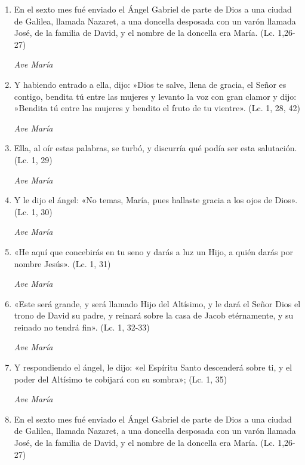 \documentclass[a4paper,11pt, oneside]{report}
\begin{document}
      \begin{enumerate}
        \item En el sexto mes fué enviado el Ángel Gabriel de parte de Dios a una ciudad de Galilea, llamada Nazaret, a una 
        doncella desposada con un varón llamada José, de la familia de David, y el nombre de la doncella era María. (Lc. 1,26- 27)

        \textit{Ave María}

        \item Y habiendo entrado a ella, dijo: »Dios te salve, llena de gracia, el Señor es contigo, bendita tú entre las mujeres 
        y levanto la voz con gran clamor y dijo: »Bendita tú entre las mujeres y bendito el fruto de tu vientre». (Lc. 1, 28, 42)

        \textit{Ave María}

        \item Ella, al oír estas palabras, se turbó, y discurría qué podía ser esta salutación. (Lc. 1, 29)

        \textit{Ave María}

        \item Y le dijo el ángel: «No temas, María, pues hallaste gracia a los ojos de Dios». (Lc. 1, 30)

        \textit{Ave María}

        \item «He aquí que concebirás en tu seno y darás a luz un Hijo, a quién darás por nombre Jesús». (Lc. 1, 31)

        \textit{Ave María}

        \item «Este será grande, y será llamado Hijo del Altísimo, y le dará el Señor Dios el trono de David su padre, 
        y reinará sobre la casa de Jacob etérnamente, y su reinado no tendrá fin». (Lc. 1, 32-33)

        \textit{Ave María}

        \item Y respondiendo el ángel, le dijo: «el Espíritu Santo descenderá sobre ti, 
        y el poder del Altísimo te cobijará con su sombra»; (Lc. 1, 35)
        
        \textit{Ave María}

        \item En el sexto mes fué enviado el Ángel Gabriel de parte de Dios a una ciudad de Galilea, llamada Nazaret, a una 
        doncella desposada con un varón llamada José, de la familia de David, y el nombre de la doncella era María. (Lc. 1,26- 27)


\end{enumerate}
\end{document}
